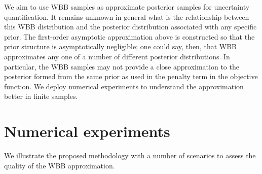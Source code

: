 \documentclass[12pt]{TD-CJS}
\begin{document}
We aim to use WBB samples as approximate posterior samples for uncertainty quantification.  It remains 
unknown in general what is the relationship between this WBB distribution and the posterior distribution
associated with any specific prior.  The first-order asymptotic approximation above is constructed so that the prior
structure is asymptotically negligible; one could say, then, that WBB approximates any one of a number of different
posterior distributions.  In particular, the WBB samples may not provide a close approximation to the posterior
formed from the same prior as used in the penalty term in the objective function.  We deploy numerical
experiments  to understand the approximation better in finite samples.

\section{Numerical experiments}
We illustrate the proposed methodology with a number of scenarios to assess 
the quality of the WBB approximation.
\end{document}
